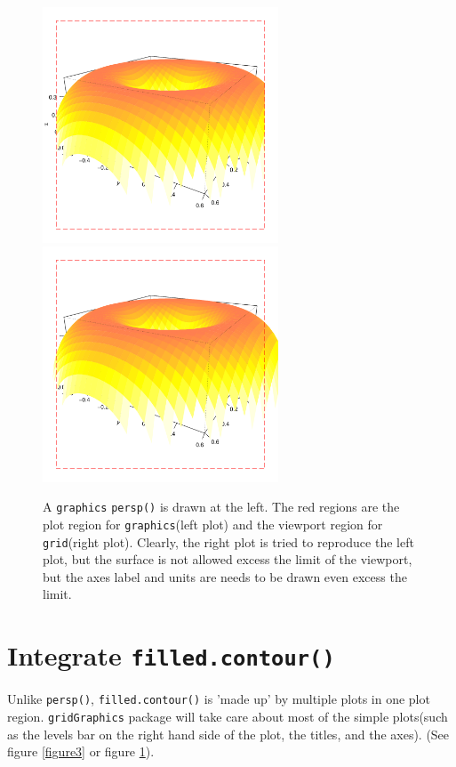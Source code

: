 \documentclass[paper=a4, fontsize=11pt]{report}
\begin{document}
\begin{figure}[h]
\begin{center}
  \includegraphics[height = 7cm, width = 7cm]{figure/gridGraphics_persp_demo_viewport3_1.pdf}
  \includegraphics[height = 7cm, width = 7cm]{figure/gridGraphics_persp_demo_viewport3_2.pdf}
  \caption{A \texttt{graphics} \texttt{persp()} is drawn at the left. The red regions are the plot region for \texttt{graphics}(left plot) and the viewport region for \texttt{grid}(right plot). Clearly, the right plot is tried to reproduce the left plot, but the surface is not allowed excess the limit of the viewport, but the axes label and units are needs to be drawn even excess the limit.}
  	\label{figure8}
\end{center}
\end{figure}



\section{Integrate \texttt{filled.contour()}}
Unlike \texttt{persp()}, \texttt{filled.contour()} is 'made up' by multiple plots in one plot region. \texttt{gridGraphics} package will take care about most of the simple plots(such as the levels bar on the right hand side of the plot, the titles, and the axes). (See figure \ref{figure3} or figure \ref{figure8}).\\
\end{document}
